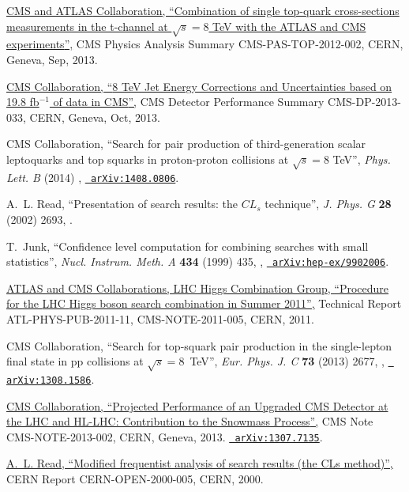 \documentclass[12pt]{thesis}  %
\begin{document}
\begin{thebibliography}{100}
\href {https://cds.cern.ch/record/1601029} {{ CMS and ATLAS} Collaboration,
  ``{Combination of single top-quark cross-sections measurements in the
  t-channel at $\sqrt{s} = 8$ TeV with the ATLAS and CMS experiments}'',} CMS
  Physics Analysis Summary CMS-PAS-TOP-2012-002, CERN, Geneva, Sep, 2013.

\href {https://cds.cern.ch/record/1627305} {{ CMS} Collaboration, ``{8 TeV Jet
  Energy Corrections and Uncertainties based on 19.8 fb$^{-1}$ of data in
  CMS}'',} CMS Detector Performance Summary CMS-DP-2013-033, CERN, Geneva, Oct,
  2013.

\hrefCMSnoop {} {{ CMS} Collaboration, ``Search for pair production of
  third-generation scalar leptoquarks and top squarks in proton-proton
  collisions at $\sqrt{s} = 8$ TeV'',} \textit{ Phys. Lett. B} (2014)
  \href{http://dx.doi.org/10.1016/j.physletb.2014.10.063}{},
  \href{http://www.arXiv.org/abs/1408.0806}{\texttt{ arXiv:1408.0806}}.

\hrefCMSnoop {} {A.~L. Read, ``{Presentation of search results: the $CL_{s}$
  technique}'',} \textit{ J. Phys. G} \textbf{ 28} (2002) 2693,
  \href{http://dx.doi.org/10.1088/0954-3899/28/10/313}{}.

\hrefCMSnoop {} {T.~Junk, ``Confidence level computation for combining searches
  with small statistics'',} \textit{ Nucl. Instrum. Meth. A} \textbf{ 434}
  (1999) 435,
  \href{http://dx.doi.org/10.1016/S0168-9002(99)00498-2}{},
  \href{http://www.arXiv.org/abs/hep-ex/9902006}{\texttt{
  arXiv:hep-ex/9902006}}.

\href {http://cdsweb.cern.ch/record/1379837} {{ATLAS and CMS Collaborations,
  LHC Higgs Combination Group}, ``Procedure for the {LHC} {H}iggs boson search
  combination in {S}ummer 2011'',} Technical Report ATL-PHYS-PUB-2011-11,
  CMS-NOTE-2011-005, CERN, 2011.

\hrefCMSnoop {} {{ CMS} Collaboration, ``Search for top-squark pair production
  in the single-lepton final state in pp collisions at $\sqrt{s} = 8$~{TeV}'',}
  \textit{ Eur. Phys. J. C} \textbf{ 73} (2013) 2677,
  \href{http://dx.doi.org/10.1140/epjc/s10052-013-2677-2}{},
  \href{http://www.arXiv.org/abs/1308.1586}{\texttt{ arXiv:1308.1586}}.

\href {https://cds.cern.ch/record/1565454} {{ CMS} Collaboration, ``{Projected
  Performance of an Upgraded CMS Detector at the LHC and HL-LHC: Contribution
  to the Snowmass Process}'',} CMS Note CMS-NOTE-2013-002, CERN, Geneva, 2013.
\newblock \href{http://www.arXiv.org/abs/1307.7135}{\texttt{ arXiv:1307.7135}}.

\href {http://cdsweb.cern.ch/record/451614} {A.~L. Read, ``Modified frequentist
  analysis of search results (the CLs method)'',} {CERN} Report
  CERN-OPEN-2000-005, CERN, 2000.

\end{thebibliography}\endgroup
\end{document}
